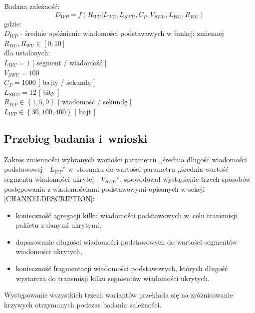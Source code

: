 \documentclass[a4paper, twoside, 12pt]{report}
\begin{document}
            Badana zależność: \\
                $$ D_{WP} = f(R_{WU} | L_{WP}, L_{SWU}, C_P, V_{SWU}, L_{WU}, R_{WU}) $$
            gdzie:\\
                    \( D_{WP} \) - średnie opóźnienie wiadomości podstawowych w funkcji zmiennej \( R_{WU}, R_{WU} \in [0;10] \) \\
           dla ustalonych: \\
                    \( L_{WU} = 1 \) [ segment / wiadomość ]\\
                    \( V_{SWU} = 100 \)\\
                    \( C_P = 1000 \) [ bajty / sekundę ]\\
                    \( L_{SWU} = 12 \) [ bity ]\\
                    \( R_{WP} \in \left\{ 1, 5, 9 \right\}\) [ wiadomość / sekundę ]\\
                    \( L_{WP} \in \left\{ 30, 100, 400 \right\}\) [ bajt ]\\
        \subsection{Przebieg badania i~wnioski}
            Zakres zmienności wybranych wartości parametru ,,średnia długość
            wiadomości podstawowej - \(  L_{WP} \)'' w~stosunku do wartości parametru
            ,,średnia wartość segmentu wiadomości ukrytej - \( V_{SWU} \)'',
            spowodował wystąpienie trzech sposobów postępowania z wiadomościami podstawowymi
            opisanych w sekcji \ref{CHANNELDESCRIPTION}:
        \begin{itemize}
            \item konieczność agregacji kilku wiadomości podstawowych w~celu transmisji pakietu z danymi ukrytymi,
            \item dopasowanie długości wiadomości podstawowych do wartości segmentów wiadomości ukrytych,
            \item konieczność fragmentacji wiadomości podstawowych, których długość wystarcza do transmisji kilku segmentów wiadomości ukrytych.
        \end{itemize}
            Występowanie wszystkich trzech wariantów przekłada
            się na zróżnicowanie krzywych otrzymanych podczas badania zależności.
\end{document}
